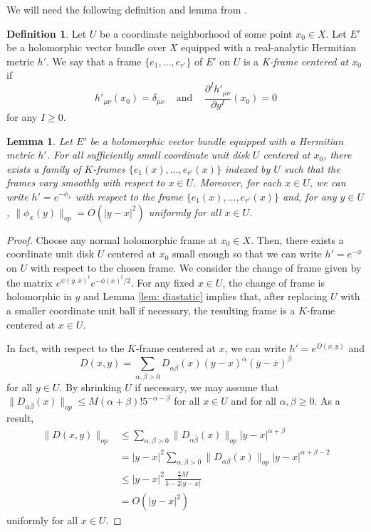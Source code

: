 \documentclass{amsart}
\newtheorem{lem}[thm]{Lemma}
\theoremstyle{definition}
\newtheorem{defn}[thm]{Definition}
\theoremstyle{remark}
\numberwithin{equation}{section}
\begin{document}
We will need the following definition and lemma from \cite{LL}.

\begin{defn}
Let $U$ be a coordinate neighborhood of some point $x_0 \in X$. Let $E'$ be a holomorphic vector bundle over $X$ equipped with a real-analytic Hermitian metric $h'$. We say that a frame $\{e_1, \dotsc, e_{r'}\}$ of $E'$ on $U$ is a \emph{K-frame centered at $x_0$} if
$$
h'_{\mu\nu}(x_0) = \delta_{\mu\nu} \hspace{10pt} \text{ and } \hspace{10pt} \frac{\partial^I h'_{\mu\nu}}{\partial y^I} (x_0) = 0
$$
for any $I \geq 0$.
\end{defn}



\begin{lem} \label{lem: K-frame}
Let $E'$ be a holomorphic vector bundle equipped with a Hermitian metric $h'$. For all sufficiently small coordinate unit disk $U$ centered at $x_0$, there exists a family of $K$-frames $\{e_1(x), \dotsc, e_{r'}(x)\}$ indexed by $U$ such that the frames vary smoothly with respect to $x \in U$. Moreover, for each $x \in U$, we can write $h' = e^{-\phi_x}$ with respect to the frame $\{e_1(x), \dotsc, e_{r'}(x)\}$ and, for any $y \in U$, $\|\phi_x(y)\|_{op} = O(|y-x|^2)$ uniformly for all $x \in U$.
\end{lem}

\begin{proof}
Choose any normal holomorphic frame at $x_0 \in X$. Then, there exists a coordinate unit disk $U$ centered at $x_0$ small enough so that we can write $h' = e^{-\phi}$ on $U$ with respect to the chosen frame. We consider the change of frame given by the matrix $e^{\psi(y,\overline{x})^t} e^{-\phi(x)^t/2}$. For any fixed $x \in U$, the change of frame is holomorphic in $y$ and Lemma \ref{lem: diastatic} implies that, after replacing $U$ with a smaller coordinate unit ball if necessary, the resulting frame is a $K$-frame centered at $x \in U$.

In fact, with respect to the $K$-frame centered at $x$, we can write $h' = e^{D(x,y)}$ and 
$$
D(x,y) = \sum_{\alpha,\beta > 0} D_{\alpha\overline{\beta}}(x) (y-x)^\alpha (\overline{y} - \overline{x})^\beta
$$
for all $y \in U$. By shrinking $U$ if necessary, we may assume that $\| D_{\alpha \overline{\beta}}(x) \|_{op} \leq M (\alpha + \beta)! 5^{-\alpha -\beta}$ for all $x \in U$ and for all $\alpha,\beta \geq 0$. As a result, 
\begin{equation*}
\begin{split}
\|D(x,y)\|_{op} & \leq \sum_{\alpha,\beta > 0} \|D_{\alpha\overline{\beta}}(x)\|_{op} |y-x|^{\alpha+\beta} \\
    & = |y-x|^2 \sum_{\alpha,\beta > 0} \|D_{\alpha\overline{\beta}}(x)\|_{op} |y-x|^{\alpha+\beta-2} \\
    & \leq |y-x|^2 \frac{\frac{4}{5}M}{5 - 2|y-x|} \\
    & = O(|y-x|^2)
\end{split}
\end{equation*}
uniformly for all $x \in U$.
\end{proof}
\end{document}
